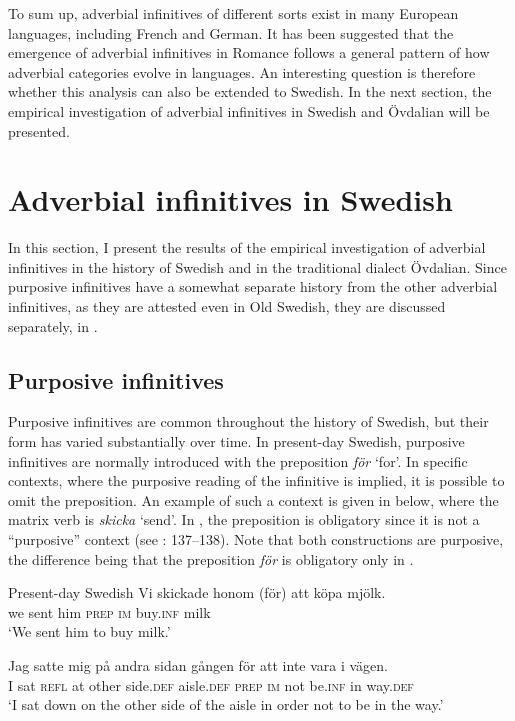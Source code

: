 \documentclass[output=paper]{langscibook}
\begin{document}
To sum up, adverbial infinitives of different sorts exist in many European languages, including French and German. It has been suggested that the emergence of adverbial infinitives in Romance follows a general pattern of how adverbial categories evolve in languages. An interesting question is therefore whether this analysis can also be extended to Swedish. In the next section, the empirical investigation of adverbial infinitives in Swedish and Övdalian will be presented. 


\section{Adverbial infinitives in Swedish}\label{sec:kalm:4}
In this section, I present the results of the empirical investigation of adverbial infinitives in the history of Swedish and in the traditional dialect Övdalian. Since purposive infinitives have a somewhat separate history from the other adverbial infinitives, as they are attested even in Old Swedish, they are discussed separately, in .


\subsection{Purposive infinitives}\label{sec:kalm:4.1}
Purposive infinitives are common throughout the history of Swedish, but their form has varied substantially over time. In present-day Swedish, purposive infinitives are normally introduced with the preposition \textit{för} ‘for’. In specific contexts, where the purposive reading of the infinitive is implied, it is possible to omit the preposition. An example of such a context is given in  below, where the matrix verb is \textit{skicka} ‘send’. In , the preposition is obligatory since it is not a “purposive” context (see \citealt{Kalm2016Satsekvivalenta}: 137–138). Note that both constructions are purposive, the difference being that the preposition \textit{för} is obligatory only in .


\ea Present-day Swedish\label{ex:kalm:8}
\ea \label{ex:kalm:8a}
\gll Vi skickade honom (för) att köpa mjölk.\\
we sent him \textsc{prep} \textsc{im} buy.\textsc{inf} milk\\
\glt ‘We sent him to buy milk.’

\ex  \label{ex:kalm:8b}
\gll Jag satte mig på andra sidan gången för att inte vara i vägen.\\
 I sat \textsc{refl} at other side.\textsc{def} aisle.\textsc{def} \textsc{prep} \textsc{im} not be.\textsc{inf} in way.\textsc{def}\\
\glt ‘I sat down on the other side of the aisle in order not to be in the way.’
\z 
\z 
\end{document}
